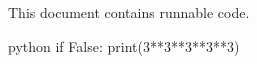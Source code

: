 \documentclass{article}
\begin{document}
This document contains runnable code.

\begin{runnableCode}{python}
if False:
    print(3**3**3**3**3)
\end{runnableCode}
\end{document}
